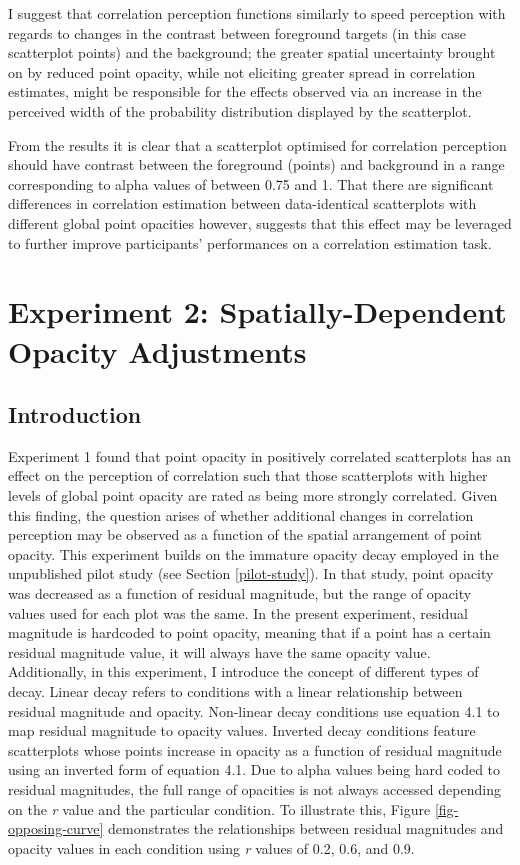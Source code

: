 \documentclass[../main.tex]{subfiles}
\begin{document}
I suggest that correlation perception functions similarly to speed
perception \cite{champion_2017} with regards to changes in the contrast
between foreground targets (in this case scatterplot points) and the
background; the greater spatial uncertainty brought on by reduced point
opacity, while not eliciting greater spread in correlation estimates,
might be responsible for the effects observed via an increase in the
perceived width of the probability distribution displayed by the
scatterplot.

From the results it is clear that a scatterplot optimised for
correlation perception should have contrast between the foreground
(points) and background in a range corresponding to alpha values of
between 0.75 and 1. That there are significant differences in
correlation estimation between data-identical scatterplots with
different global point opacities however, suggests that this effect may
be leveraged to further improve participants' performances on a
correlation estimation task.

\section{Experiment 2: Spatially-Dependent Opacity
Adjustments}\label{experiment-2-spatially-dependent-opacity-adjustments}

\subsection{Introduction}\label{introduction-e2}

Experiment 1 found that point opacity in positively correlated
scatterplots has an effect on the perception of correlation such that
those scatterplots with higher levels of global point opacity are rated
as being more strongly correlated. Given this finding, the question
arises of whether additional changes in correlation perception may be
observed as a function of the spatial arrangement of point opacity. This
experiment builds on the immature opacity decay employed in the
unpublished pilot study (see Section \ref{pilot-study}). In that study,
point opacity was decreased as a function of residual magnitude, but the
range of opacity values used for each plot was the same. In the present
experiment, residual magnitude is hardcoded to point opacity, meaning
that if a point has a certain residual magnitude value, it will always
have the same opacity value. Additionally, in this experiment, I
introduce the concept of different types of decay. Linear decay refers
to conditions with a linear relationship between residual magnitude and
opacity. Non-linear decay conditions use equation 4.1 to map residual
magnitude to opacity values. Inverted decay conditions feature
scatterplots whose points increase in opacity as a function of residual
magnitude using an inverted form of equation 4.1. Due to alpha values
being hard coded to residual magnitudes, the full range of opacities is
not always accessed depending on the \emph{r} value and the particular
condition. To illustrate this, Figure \ref{fig-opposing-curve}
demonstrates the relationships between residual magnitudes and opacity
values in each condition using \emph{r} values of 0.2, 0.6, and 0.9.
\end{document}
